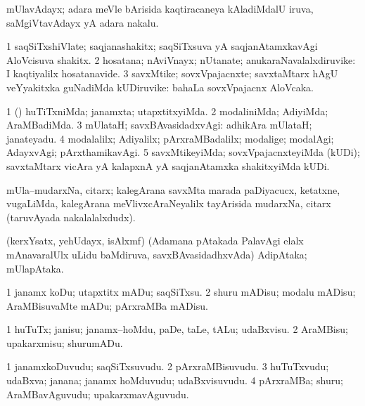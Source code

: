 \bentry
{}
\gl{\nA}
\bmng
mUlavAdayx; adara meVle bArisida kaqtiracaneya kAladiMdalU iruva, saMgiVtavAdayx yA adara nakalu. 
\emng
\eentry

\bentry
{}
\gl{\nA}
\bmng
\bnum
\num{1} saqSiTxshiVlate; saqjanashakitx; saqSiTxsuva yA saqjanAtamxkavAgi AloVcisuva shakitx. 
\num{2} hosatana; nAviVnayx; nUtanate; anukaraNavalalxdiruvike:  I kaqtiyalilx hosatanavide. 
\num{3} savxMtike; sovxVpajacnxte; savxtaMtarx hAgU veYyakitxka guNadiMda kUDiruvike:  bahaLa sovxVpajacnx AloVcaka. 
\enum
\emng
\eentry

\bentry
{}
\gl{\kirxvi}
\bmng
\bnum
\num{1} (\pArxparx) huTiTxniMda; janamxta; utapxtitxyiMda. 
\num{2} modaliniMda; AdiyiMda; AraMBadiMda. 
\num{3} mUlataH; savxBAvasidadxvAgi:  adhikAra mUlataH; janateyadu. 
\num{4} modalalilx; Adiyalilx; pArxraMBadalilx; modalige; modalAgi; AdayxvAgi; pArxthamikavAgi. 
\num{5} savxMtikeyiMda; sovxVpajacnxteyiMda (kUDi); savxtaMtarx vicAra yA kalapxnA yA saqjanAtamxka shakitxyiMda kUDi. 
\enum
\emng
\eentry

\bentry
{}
\gl{\nA}
\bmng
mUla--mudarxNa, citarx; kalegArana savxMta marada paDiyacucx, ketatxne, \mo vugaLiMda, kalegArana meVlivxcAraNeyalilx tayArisida mudarxNa, citarx (taruvAyada nakalalalxdudx). 
\emng
\eentry

\bentry
{}
\gl{\nA}
\bmng
(kerxYsatx, yehUdayx, isAlxmf) (Adamana pAtakada PalavAgi elalx mAnavaralUlx uLidu baMdiruva, savxBAvasidadhxvAda) AdipAtaka; mUlapAtaka. 
\emng
\eentry

\bentry
{}
\gl{\sakirx}
\bmng
\bnum
\num{1} janamx koDu; utapxtitx mADu; saqSiTxsu. 
\num{2} shuru mADisu; modalu mADisu; AraMBisuvaMte mADu; pArxraMBa mADisu. 
\enum
\emng

\noindent
\gl{\akirx}
\bmng
\bnum
\num{1} huTuTx; janisu; janamx--hoMdu, paDe, taLe, tALu; udaBxvisu. 
\num{2} AraMBisu; upakarxmisu; shurumADu. 
\enum
\emng
\eentry

\bentry
{}
\gl{\nA}
\bmng
\bnum
\num{1} janamxkoDuvudu; saqSiTxsuvudu. 
\num{2} pArxraMBisuvudu. 
\num{3} huTuTxvudu; udaBxva; janana; janamx hoMduvudu; udaBxvisuvudu. 
\num{4} pArxraMBa; shuru; AraMBavAguvudu; upakarxmavAguvudu. 
\enum
\emng
\eentry

